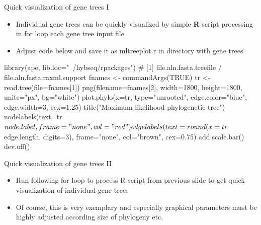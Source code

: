\documentclass[compress,  xelatex, 11pt, xcolor=x11names, aspectratio=169,
	hyperref={
		bookmarks=true,
		unicode=true,
		colorlinks=true,
		pdftitle={HybSeq course},
		plainpages=false,
		pdfauthor={Vojtech Zeisek},
		pdfsubject={Practical processing of HybSeq target enrichment sequencing data on computing grids like MetaCentrum},
		pdfcreator={XeLaTeX},
		pdfkeywords={BASH, command line, GNU, HybSeq, Linux, MetaCentrum, sequencing shell, target enrichment},
		linkcolor=Turquoise4, %
		anchorcolor=DodgerBlue4, %
		citecolor=DodgerBlue4, %
		filecolor=DodgerBlue4, %
		menucolor=Tan4, %
		urlcolor=DarkOliveGreen4 %
		},
	url={hyphens, lowtilde} %
	]{beamer}
\renewcommand{\texttt}[1]{\colorbox{Cornsilk2}{{\ttfamily #1}}}
\begin{document}
\begin{frame}[fragile]{Quick visualization of gene trees I}
	\begin{itemize}
		\item Individual gene trees can be quickly visualized by simple \textbf{R} script processing in \texttt{for} loop each gene tree input file
		\item Adjust code below and save it as \texttt{mltreeplot.r} in directory  with gene trees
	\end{itemize}
	\begin{spluscode}
    library(ape, lib.loc="~/hybseq/rpackages")
    # [1] file.aln.fasta.treefile / file.aln.fasta.raxml.support
    fnames <- commandArgs(TRUE)
    tr <- read.tree(file=fnames[1])
    png(filename=fnames[2], width=1800, height=1800, units="px", bg="white")
      plot.phylo(x=tr, type="unrooted", edge.color="blue", edge.width=3,
        cex=1.25)
      title("Maximum-likelihood phylogenetic tree")
      nodelabels(text=tr$node.label, frame="none", col="red")
      edgelabels(text=round(x=tr$edge.length, digits=3), frame="none",
        col="brown", cex=0.75)
      add.scale.bar()
      dev.off()
	\end{spluscode}
\end{frame}

\begin{frame}[fragile]{Quick visualization of gene trees II}
	\begin{itemize}
		\item Run following \texttt{for} loop to process \texttt{R} script from previous slide to get quick visualization of individual gene trees
		\item Of course, this is very exemplary and especially graphical parameters must be highly adjusted according size of phylogeny etc.
	\end{itemize}
\end{frame}
\end{document}
